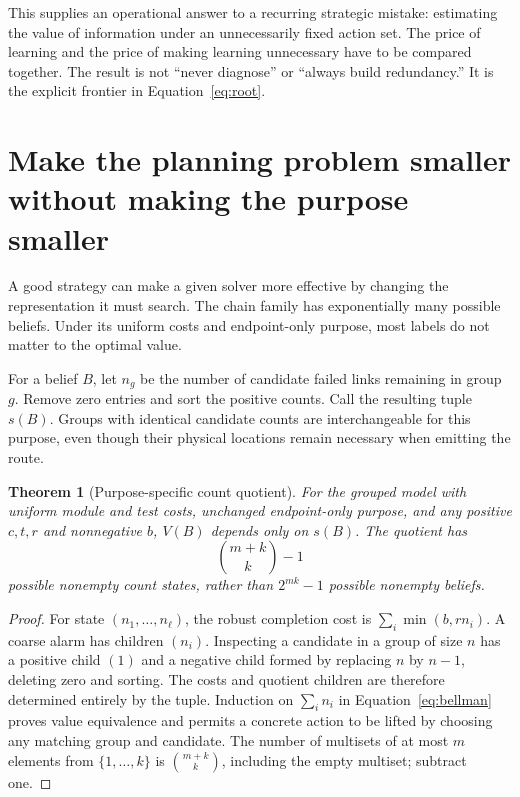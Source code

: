 \documentclass[11pt,letterpaper]{article}
\newtheorem{theorem}{Theorem}[section]
\theoremstyle{remark}\newtheorem{remark}{Remark}[section]
\begin{document}
This supplies an operational answer to a recurring strategic mistake: estimating the value of information under an unnecessarily fixed action set. The price of learning and the price of making learning unnecessary have to be compared together. The result is not ``never diagnose'' or ``always build redundancy.'' It is the explicit frontier in Equation~\eqref{eq:root}.

\section{Make the planning problem smaller without making the purpose smaller}
\label{sec:quotient}
A good strategy can make a given solver more effective by changing the representation it must search. The chain family has exponentially many possible beliefs. Under its uniform costs and endpoint-only purpose, most labels do not matter to the optimal value.

For a belief $B$, let $n_g$ be the number of candidate failed links remaining in group $g$. Remove zero entries and sort the positive counts. Call the resulting tuple $s(B)$. Groups with identical candidate counts are interchangeable for this purpose, even though their physical locations remain necessary when emitting the route.

\begin{theorem}[Purpose-specific count quotient]\label{thm:quotient}
For the grouped model with uniform module and test costs, unchanged endpoint-only purpose, and any positive $c,t,r$ and nonnegative $b$, $V(B)$ depends only on $s(B)$. The quotient has
\begin{equation}\label{eq:states}
\binom{m+k}{k}-1
\end{equation}
possible nonempty count states, rather than $2^{mk}-1$ possible nonempty beliefs.
\end{theorem}
\begin{proof}
For state $(n_1,\ldots,n_\ell)$, the robust completion cost is $\sum_i\min(b,rn_i)$. A coarse alarm has children $(n_i)$. Inspecting a candidate in a group of size $n$ has a positive child $(1)$ and a negative child formed by replacing $n$ by $n-1$, deleting zero and sorting. The costs and quotient children are therefore determined entirely by the tuple. Induction on $\sum_i n_i$ in Equation~\eqref{eq:bellman} proves value equivalence and permits a concrete action to be lifted by choosing any matching group and candidate. The number of multisets of at most $m$ elements from $\{1,\ldots,k\}$ is $\binom{m+k}{k}$, including the empty multiset; subtract one.
\end{proof}
\end{document}
